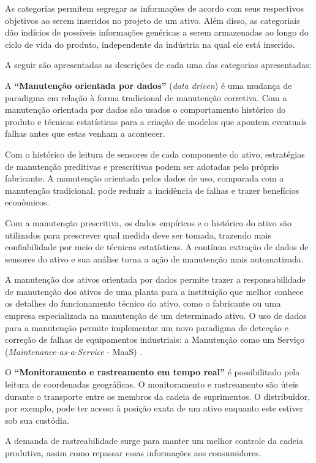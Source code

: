 As categorias permitem segregar as informações de acordo com seus respectivos objetivos ao serem inseridos no projeto de um ativo. Além disso, as categoriais dão indícios de possíveis informações genéricas a serem armazenadas ao longo do ciclo de vida do produto, independente da indústria na qual ele está inserido.

A seguir são apresentadas as descrições de cada uma das categorias apresentadas:

A \textbf{``Manutenção orientada por dados''} (\textit{data driven}) é uma mudança de paradigma em relação à forma tradicional de manutenção corretiva. Com a manutenção orientada por dados são usados o comportamento histórico do produto e técnicas estatísticas para a criação de modelos que apontem eventuais falhas antes que estas venham a acontecer.

Com o histórico de leitura de sensores de cada componente do ativo, estratégias de manutenção preditivas e prescritivas podem ser adotadas pelo próprio fabricante. A manutenção orientada pelos dados de uso, comparada com a manutenção tradicional, pode reduzir a incidência de falhas e trazer benefícios econômicos. %

Com a manutenção prescritiva, os dados empíricos e o histórico do ativo são utilizados para prescrever qual medida deve ser tomada, trazendo mais confiabilidade por meio de técnicas estatísticas. A contínua extração de dados de sensores do ativo e sua análise torna a ação de manutenção mais automatizada.

A manutenção dos ativos orientada por dados permite trazer a responsabilidade de manutenção dos ativos de uma planta para a instituição que melhor conhece os detalhes do funcionamento técnico do ativo, como o fabricante ou uma empresa especializada na manutenção de um determinado ativo. O uso de dados para a manutenção permite implementar um novo paradigma de detecção e correção de falhas de equipamentos industriais: a Manutenção como um Serviço (\textit{Maintenance-as-a-Service} - MaaS) \cite{zoll2018maas}.

O \textbf{``Monitoramento e rastreamento em tempo real''} é possibilitado pela leitura de coordenadas geográficas. O monitoramento e rastreamento são úteis durante o transporte entre os membros da cadeia de suprimentos. O distribuidor, por exemplo, pode ter acesso à posição exata de um ativo enquanto este estiver sob sua custódia.

A demanda de rastreabilidade surge para manter um melhor controle da cadeia produtiva, assim como repassar essas informações aos consumidores.

